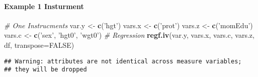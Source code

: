 \documentclass[
]{book}
\newenvironment{Shaded}{\begin{snugshade}}{\end{snugshade}}
\newcommand{\CommentTok}[1]{\textcolor[rgb]{0.56,0.35,0.01}{\textit{#1}}}
\newcommand{\DataTypeTok}[1]{\textcolor[rgb]{0.13,0.29,0.53}{#1}}
\newcommand{\KeywordTok}[1]{\textcolor[rgb]{0.13,0.29,0.53}{\textbf{#1}}}
\newcommand{\NormalTok}[1]{#1}
\newcommand{\OtherTok}[1]{\textcolor[rgb]{0.56,0.35,0.01}{#1}}
\newcommand{\StringTok}[1]{\textcolor[rgb]{0.31,0.60,0.02}{#1}}
\begin{document}
\hypertarget{example-1-insturment}{%
\paragraph{Example 1 Insturment}\label{example-1-insturment}}

\begin{Shaded}
\begin{Highlighting}[]
\CommentTok{# One Instrucments}
\NormalTok{var.y <-}\StringTok{ }\KeywordTok{c}\NormalTok{(}\StringTok{'hgt'}\NormalTok{)}
\NormalTok{vars.x <-}\StringTok{ }\KeywordTok{c}\NormalTok{(}\StringTok{'prot'}\NormalTok{)}
\NormalTok{vars.z <-}\StringTok{ }\KeywordTok{c}\NormalTok{(}\StringTok{'momEdu'}\NormalTok{)}
\NormalTok{vars.c <-}\StringTok{ }\KeywordTok{c}\NormalTok{(}\StringTok{'sex'}\NormalTok{, }\StringTok{'hgt0'}\NormalTok{, }\StringTok{'wgt0'}\NormalTok{)}
\CommentTok{# Regression}
\KeywordTok{regf.iv}\NormalTok{(var.y, vars.x, vars.c, vars.z, df, }\DataTypeTok{transpose=}\OtherTok{FALSE}\NormalTok{)}
\end{Highlighting}
\end{Shaded}

\begin{verbatim}
## Warning: attributes are not identical across measure variables;
## they will be dropped
\end{verbatim}
\end{document}
